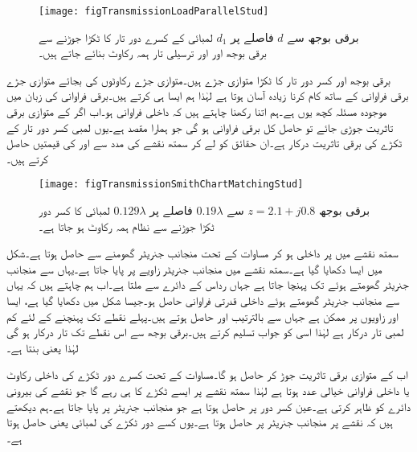 \begin{figure}
\centering
\texttt{[image: figTransmissionLoadParallelStud]}
\caption{برقی بوجھ سے $d$ فاصلے پر $d_1$ لمبائی کے کسرے دور تار کا ٹکڑا جوڑنے سے برقی بوجھ اور اور ترسیلی تار ہمہ رکاوٹ بنائے جاتے ہیں۔}
\label{شکل_ترسیلی_ہمہ_رکاوٹی_بمدد_ٹکڑا_تار}
\end{figure}

برقی بوجھ اور کسر دور تار کا ٹکڑا متوازی جڑے ہیں۔متوازی جڑے رکاوٹوں کی بجائے متوازی جڑے برقی فراوانی کے ساتھ کام کرنا زیادہ آسان ہوتا ہے لہٰذا ہم ایسا ہی کرتے ہیں۔برقی فراوانی کی زبان میں موجودہ مسئلہ کچھ یوں ہے۔ہم  اتنا رکھنا چاہتے ہیں کہ داخلی فراوانی  ہو۔اب اگر  کے متوازی  برقی تاثریت جوڑی جائے تو حاصل کل برقی فراوانی  ہو گی جو ہمارا مقصد ہے۔یوں  لمبی کسر دور تار کے ٹکڑے کی برقی تاثریت  درکار ہے۔ان حقائق کو لے کر سمتھ نقشے کی مدد سے  اور  کی قیمتیں حاصل کرتے ہیں۔

\begin{figure}
\centering
\texttt{[image: figTransmissionSmithChartMatchingStud]}
\caption{برقی بوجھ $z=2.1+j0.8$ سے $0.19\lambda$ فاصلے پر $0.129\lambda$ لمبائی کا کسر دور ٹکڑا جوڑنے سے نظام ہمہ رکاوٹ ہو جاتا ہے۔}
\label{شکل_ترسیلی_ہمہ_رکاوٹی_ٹکڑے_کا_نقشہ}
\end{figure}

سمتھ نقشے میں  پر داخلی ہو کر مساوات  کے تحت منجانب جنریٹر  گھومنے سے  حاصل ہوتا ہے۔شکل  میں ایسا دکھایا گیا ہے۔سمتھ نقشے میں  منجانب جنریٹر  زاویے پر پایا جاتا ہے۔یہاں سے منجانب جنریٹر  گھومتے ہوئے  تک پہنچا جاتا ہے جہاں  رداس کے دائرے سے  ملتا ہے۔اب ہم چاہتے ہیں کہ یہاں سے  منجانب جنریٹر  گھومتے ہوئے  داخلی قدرتی فراوانی  حاصل ہو۔جیسا شکل میں دکھایا گیا ہے، ایسا  اور  زاویوں پر ممکن ہے جہاں سے بالترتیب  اور   حاصل ہوتے ہیں۔پہلے نقطے تک پہنچنے کے لئے کم لمبی تار درکار ہے لہٰذا اسی کو جواب تسلیم کرتے ہیں۔برقی بوجھ سے اس نقطے تک  تار درکار ہو گی لہٰذا  یعنی  بنتا ہے۔

 اب  کے متوازی  برقی تاثریت جوڑ کر  حاصل ہو گا۔مساوات  کے تحت کسرے دور ٹکڑے کی داخلی رکاوٹ یا داخلی فراوانی خیالی عدد ہوتا ہے لہٰذا سمتھ نقشے پر ایسے ٹکڑے کا  ہی رہے گا جو نقشے کی بیرونی دائرے کو ظاہر کرتی ہے۔عین کسر دور پر  حاصل ہوتا ہے جو منجانب جنریٹر   پر پایا جاتا ہے۔ہم دیکھتے ہیں کہ  نقشے پر منجانب جنریٹر  پر حاصل ہوتا ہے۔یوں کسے دور ٹکڑے کی لمبائی  یعنی  حاصل ہوتا ہے۔   

